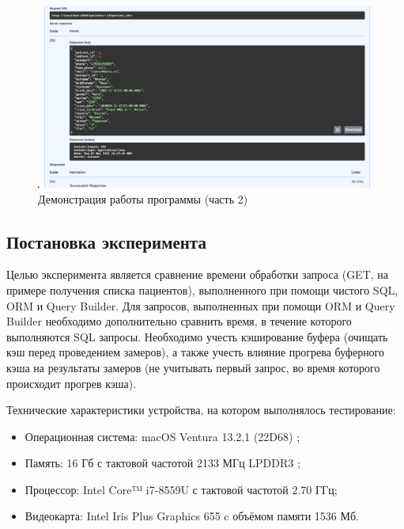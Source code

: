 \begin{figure}[h]
	\centering
	\captionsetup{justification=centering}
 	\includegraphics[width=152mm]{img/example-2.png}
	\caption{Демонстрация  работы  программы  (часть 2)}
	\label{fig:example-2}
\end{figure}

\subsection{Постановка эксперимента}

Целью эксперимента является сравнение времени обработки запроса \linebreak (GET, на примере получения списка пациентов), выполненного при помощи чистого SQL, ORM и Query Builder. Для запросов, выполненных при помощи ORM и Query Builder необходимо дополнительно сравнить время, в течение которого выполняются SQL запросы. Необходимо учесть кэширование буфера (очищать кэш перед проведением замеров), а также учесть влияние прогрева буферного кэша на результаты замеров (не учитывать первый запрос, во время которого происходит прогрев кэша).

Технические характеристики устройства, на котором выполнялось тестирование:

\begin{itemize}[label=---]
	\item Операционная система: macOS Ventura 13.2.1 (22D68) \cite{macos};
	\item Память: 16 Гб с тактовой частотой 2133 МГц LPDDR3 \cite{memory};
	\item Процессор: Intel Core™ i7-8559U \cite{intel} с тактовой частотой  2.70 ГГц;
	\item Видеокарта: Intel Iris Plus Graphics 655 \cite{graphics} c объёмом памяти 1536 Мб.
\end{itemize}

